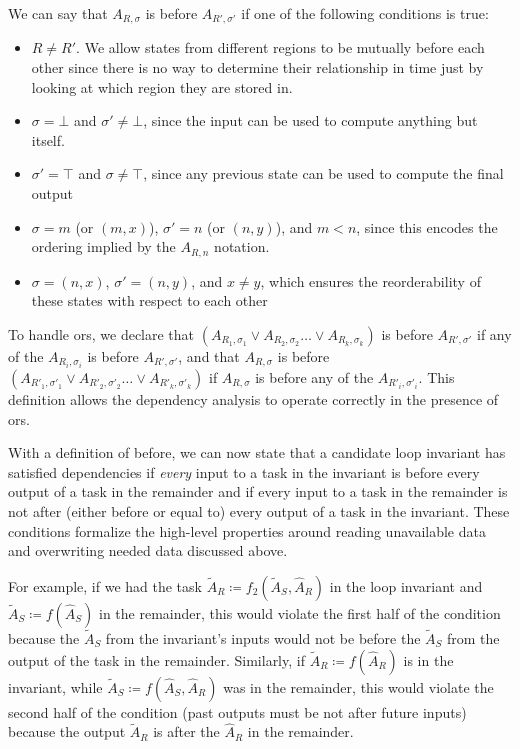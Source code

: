 \documentclass[12pt,letterpaper]{article}
\begin{document}
We can say that $A_{R, \sigma}$ is before $A_{R', \sigma'}$ if one of the following conditions is true:
\begin{itemize}
\item $R \neq R'$. We allow states from different regions to be mutually before each other since there is no way to determine their relationship in time just by looking at which region they are stored in.
\item $\sigma = \bot$ and $\sigma' \neq \bot$, since the input can be used to compute anything but itself.
\item $\sigma' = \top$ and $\sigma \neq \top$, since any previous state can be used to compute the final output
\item $\sigma = m$ (or $(m, x)$), $\sigma' = n$ (or $(n, y)$), and $m < n$, since this encodes the ordering implied by the $A_{R, n}$ notation.
\item $\sigma = (n, x)$, $\sigma' = (n, y)$, and $x \neq y$, which ensures the reorderability of these states with respect to each other
\end{itemize}

To handle ors, we declare that $(A_{R_1, \sigma_1} \vee A_{R_2, \sigma_2} \ldots \vee A_{R_k, \sigma_k})$ is before $A_{R', \sigma'}$ if any of the $A_{R_i, \sigma_i}$ is before $A_{R', \sigma'}$, and that $A_{R, \sigma}$ is before $(A_{R'_1, \sigma'_1} \vee A_{R'_2, \sigma'_2} \ldots \vee A_{R'_k, \sigma'_k})$ if $A_{R, \sigma}$ is before any of the $A_{R'_i, \sigma'_i}$.
This definition allows the dependency analysis to operate correctly in the presence of ors.

With a definition of before, we can now state that a candidate loop invariant has satisfied dependencies if \emph{every} input to a task in the invariant is before every output of a task in the remainder and if every input to a task in the remainder is not after (either before or equal to) every output of a task in the invariant.
These conditions formalize the high-level properties around reading unavailable data and overwriting needed data discussed above.

For example, if we had the task $\widetilde{A}_R \coloneqq f_2(\widetilde{A}_S, \hat{A}_R)$ in the loop invariant and $\widetilde{A}_S \coloneqq f(\hat{A}_S)$ in the remainder, this would violate the first half of the condition because the $\widetilde{A}_S$ from the invariant's inputs would not be before the $\widetilde{A}_S$ from the output of the task in the remainder.
Similarly, if $\widetilde{A}_R \coloneqq f(\hat{A}_R)$ is in the invariant, while $\widetilde{A}_S \coloneqq f(\hat{A}_S, \hat{A}_R)$ was in the remainder, this would violate the second half of the condition (past outputs must be not after future inputs) because the output $\widetilde{A}_R$ is after the $\hat{A}_R$ in the remainder.
\end{document}
